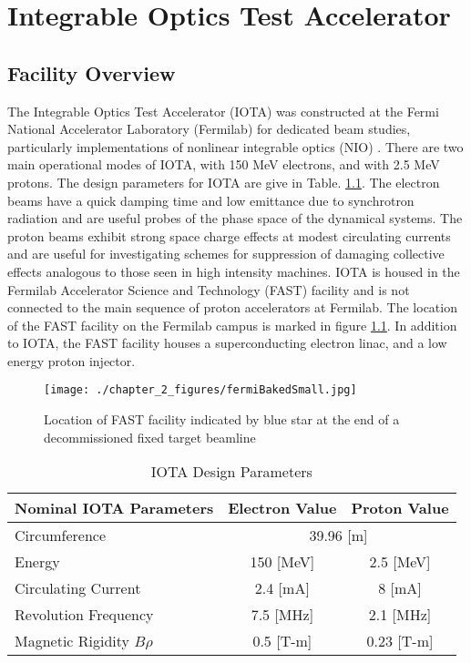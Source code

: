 \chapter{Integrable Optics Test Accelerator} \label{chap:iota}

\section{Facility Overview}

The Integrable Optics Test Accelerator (IOTA) was constructed at the Fermi National Accelerator Laboratory (Fermilab) for dedicated beam studies, particularly implementations of nonlinear integrable optics (NIO) \cite{antipovIOTAIntegrableOptics2017}. There are two main operational modes of IOTA, with 150 MeV electrons, and with 2.5 MeV protons. The design parameters for IOTA are give in Table. \ref{tab:IOTAdesign}. The electron beams have a quick damping time and low emittance due to synchrotron radiation and are useful probes of the phase space of the dynamical systems. The proton beams exhibit strong space charge effects at modest circulating currents and are useful for investigating schemes for suppression of damaging collective effects analogous to those seen in high intensity machines. IOTA is housed in the Fermilab Accelerator Science and Technology (FAST) facility and is not connected to the main sequence of proton accelerators at Fermilab. The location of the FAST facility on the Fermilab campus is marked in figure \ref{fig:FastMap}. In addition to IOTA, the FAST facility houses a superconducting electron linac, and a low energy proton injector.

\begin{figure}
	\centering
	\texttt{[image: ./chapter\_2\_figures/fermiBakedSmall.jpg]}
	\caption{Location of FAST facility indicated by blue star at the end of a decommissioned fixed target beamline}
	\label{fig:FastMap}
\end{figure}


\begin{table}
    \centering
    \begin{tabular}{lcc}
    \toprule
    \textbf{Nominal IOTA Parameters} & \textbf{Electron Value} & \textbf{Proton Value}\\
    \midrule
    Circumference & \multicolumn{2}{c}{39.96 [m]}\\
    Energy & 150 [MeV] & 2.5 [MeV]\\
    Circulating Current & 2.4 [mA] & 8 [mA] \\
    Revolution Frequency & 7.5 [MHz] & 2.1 [MHz]\\
    Magnetic Rigidity $B\rho$ & 0.5 [T-m] & 0.23 [T-m]\\
    \bottomrule
    \end{tabular}
    \caption{IOTA Design Parameters}
    \label{tab:IOTAdesign}
\end{table}


